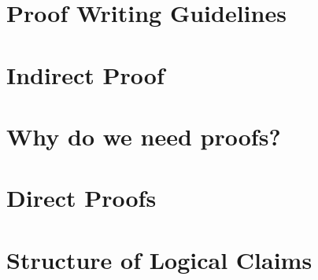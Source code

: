 \section{Proof Writing Guidelines}


\section{Indirect Proof}


\section{Why do we need proofs?}


\section{Direct Proofs}


\section{Structure of Logical Claims}

